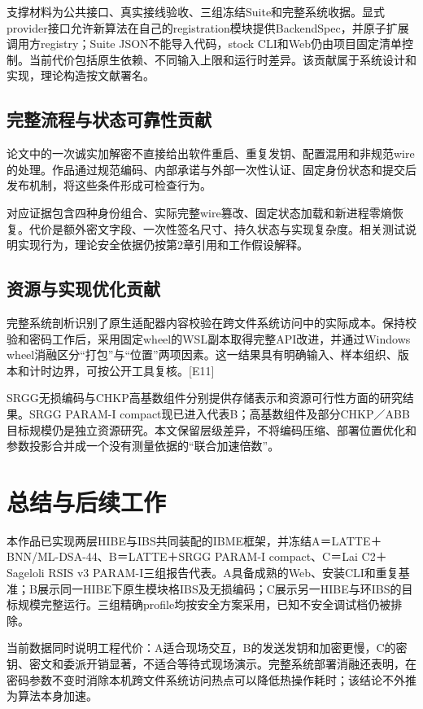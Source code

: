 \documentclass[UTF8,a4paper,12pt,oneside,openany,fontset=fandol]{ctexrep}
\begin{document}
支撑材料为公共接口、真实接线验收、三组冻结Suite和完整系统收据。显式provider接口允许新算法在自己的registration模块提供BackendSpec，并原子扩展调用方registry；Suite JSON不能导入代码，stock CLI和Web仍由项目固定清单控制。当前代价包括原生依赖、不同输入上限和运行时差异。该贡献属于系统设计和实现，理论构造按文献署名。

\section{完整流程与状态可靠性贡献}
论文中的一次诚实加解密不直接给出软件重启、重复发钥、配置混用和非规范wire的处理。作品通过规范编码、内部承诺与外部一次性认证、固定身份状态和提交后发布机制，将这些条件形成可检查行为。

对应证据包含四种身份组合、实际完整wire篡改、固定状态加载和新进程零熵恢复。代价是额外密文字段、一次性签名尺寸、持久状态与实现复杂度。相关测试说明实现行为，理论安全依据仍按第2章引用和工作假设解释。

\section{资源与实现优化贡献}
完整系统剖析识别了原生适配器内容校验在跨文件系统访问中的实际成本。保持校验和密码工作后，采用固定wheel的WSL副本取得完整API改进，并通过Windows wheel消融区分“打包”与“位置”两项因素。这一结果具有明确输入、样本组织、版本和计时边界，可按公开工具复核。[E11]

SRGG无损编码与CHKP高基数组件分别提供存储表示和资源可行性方面的研究结果。SRGG PARAM-I compact现已进入代表B；高基数组件及部分CHKP／ABB目标规模仍是独立资源研究。本文保留层级差异，不将编码压缩、部署位置优化和参数投影合并成一个没有测量依据的“联合加速倍数”。

\chapter{总结与后续工作}
本作品已实现两层HIBE与IBS共同装配的IBME框架，并冻结A＝LATTE＋BNN/ML-DSA-44、B＝LATTE＋SRGG PARAM-I compact、C＝Lai C2＋Sageloli RSIS v3 PARAM-I三组报告代表。A具备成熟的Web、安装CLI和重复基准；B展示同一HIBE下原生模块格IBS及无损编码；C展示另一HIBE与环IBS的目标规模完整运行。三组精确profile均按安全方案采用，已知不安全调试档仍被排除。

当前数据同时说明工程代价：A适合现场交互，B的发送发钥和加密更慢，C的密钥、密文和委派开销显著，不适合等待式现场演示。完整系统部署消融还表明，在密码参数不变时消除本机跨文件系统访问热点可以降低热操作耗时；该结论不外推为算法本身加速。
\end{document}
